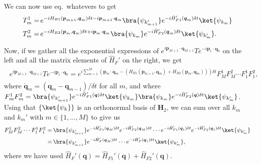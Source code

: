 \documentclass{report}
\begin{document}
We can now use eq.\ whatevers to get 
\begin{align}
\begin{aligned}
	T^1_m =&\, 
		e^{-i H_{B1}(\boldsymbol{p}_{m+1}, \boldsymbol{q}_{m}) \delta t 
			- i \boldsymbol{p}_{m+1} \cdot \boldsymbol{q}_{m}} 
		\bra{\psi_{k_{m+1}'}}
			e^{-i \hat H_{F1}'(\boldsymbol{q}_{m}) \delta t}
		\ket{\psi_{k_{m}}}\\
	T^2_m =&\, 
		e^{-i H_{B2}(\boldsymbol{p}_{m}, \boldsymbol{q}_{m}) \delta t 
			+ i \boldsymbol{p}_{m} \cdot \boldsymbol{q}_{m}} 
		\bra{\psi_{k_{m}}}
			e^{-i \hat H_{F2}'(\boldsymbol{q}_{m}) \delta t}
		\ket{\psi_{k_{m}'}}.
\end{aligned}
\end{align} 

Now, if we gather all the exponential expressions of $
	e^{i \boldsymbol{p}_{M+1} \cdot \boldsymbol{q}_{M+1}}
	T
	e^{-i \boldsymbol{p}_{1} \cdot \boldsymbol{q}_{0}}
$ on the left and all the matrix elements of $\hat H_F'$ on the right, we get
\begin{align}
\begin{aligned}
	e^{i \boldsymbol{p}_{M+1} \cdot \boldsymbol{q}_{M+1}}
	T
	e^{-i \boldsymbol{p}_{1} \cdot \boldsymbol{q}_{0}}
	=
	e^{i \sum_{m=1}^{M} (
	\boldsymbol{p}_{m} \cdot \dot{\boldsymbol{q}}_{m} 
	- (H_{B1}(\boldsymbol{p}_{m+1}, \boldsymbol{q}_{m}) + H_{B2}(\boldsymbol{p}_{m}, \boldsymbol{q}_{m}) )  
	) \delta t }
	F^1_{M}F^2_{M}\cdots F^1_{1}F^2_{1},
	\label{action_discrete_generalized_01}
\end{aligned}
\end{align}
where $\dot{\boldsymbol{q}}_{m} = (\boldsymbol{q}_{m} - \boldsymbol{q}_{m-1}) / \delta t$ for all $m$, and where $
F^1_{m}F^2_{m} = 		
	\bra{\psi_{k_{m+1}'}}
		e^{-i \hat H_{F1}'(\boldsymbol{q}) \delta t}
	\ket{\psi_{k_{m}}}
	\bra{\psi_{k_{m}}}
		e^{-i \hat H_{F2}'(\boldsymbol{q}) \delta t}
	\ket{\psi_{k_{m}'}}
$.
Using that $\{\ket{\psi_k}\}$ is an orthonormal basis of $\textbf{H}_2$, we can sum over all $k_m$ and $k_m'$ with $m\in\{1, \ldots, M\}$ to give us
\begin{align}
\begin{aligned}
	F^1_{M}F^2_{M}\cdots F^1_{1}F^2_{1} =&\, 
		\bra{\psi_{k_{m+1}'}}
			e^{-i \hat H_{F1}'(\boldsymbol{q}_{M}) \delta t}
			e^{-i \hat H_{F2}'(\boldsymbol{q}_{M}) \delta t}
			\cdots
			e^{-i \hat H_{F1}'(\boldsymbol{q}_{1}) \delta t}
			e^{-i \hat H_{F2}'(\boldsymbol{q}_{1}) \delta t}
		\ket{\psi_{k_{m}'}} 
	\\=&\,
		\bra{\psi_{k_{m+1}'}}
			e^{-i \hat H_{F}'(\boldsymbol{q}_{M}) \delta t}
			\cdots
			e^{-i \hat H_{F}'(\boldsymbol{q}_{1}) \delta t}
		\ket{\psi_{k_{m}'}},
\end{aligned}
\end{align}
where we have used $\hat H_{F}'(\boldsymbol{q}) = \hat H_{F1}'(\boldsymbol{q}) + \hat H_{F2}'(\boldsymbol{q}).$
\end{document}
